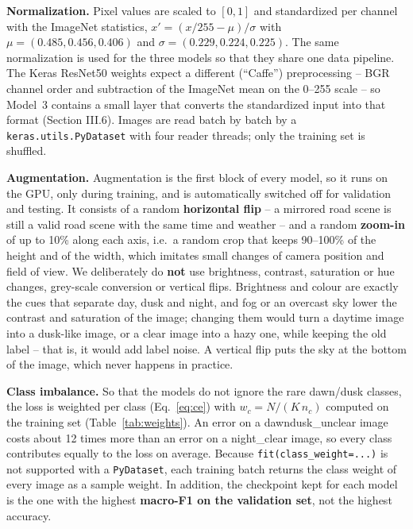 \documentclass[12pt,letterpaper]{article}
\begin{document}
\textbf{Normalization.} Pixel values are scaled to $[0,1]$ and standardized per channel with the ImageNet statistics,
$x'=(x/255-\mu)/\sigma$ with $\mu=(0.485,0.456,0.406)$ and $\sigma=(0.229,0.224,0.225)$. The same normalization is
used for the three models so that they share one data pipeline. The Keras ResNet50 weights expect a different
(``Caffe'') preprocessing -- BGR channel order and subtraction of the ImageNet mean on the 0--255 scale -- so Model~3
contains a small layer that converts the standardized input into that format (Section III.6). Images are read batch
by batch by a \texttt{keras.utils.PyDataset} with four reader threads; only the training set is shuffled.

\textbf{Augmentation.} Augmentation is the first block of every model, so it runs on the GPU, only during training,
and is automatically switched off for validation and testing. It consists of a random \textbf{horizontal flip} -- a
mirrored road scene is still a valid road scene with the same time and weather -- and a random \textbf{zoom-in} of up
to 10\% along each axis, i.e.\ a random crop that keeps 90--100\% of the height and of the width, which imitates small
changes of camera position and field of view. We deliberately do \textbf{not} use brightness, contrast, saturation or
hue changes, grey-scale conversion or vertical flips. Brightness and colour are exactly the cues that separate day,
dusk and night, and fog or an overcast sky lower the contrast and saturation of the image; changing them would turn a
daytime image into a dusk-like image, or a clear image into a hazy one, while keeping the old label -- that is, it
would add label noise. A vertical flip puts the sky at the bottom of the image, which never happens in practice.

\textbf{Class imbalance.} So that the models do not ignore the rare dawn/dusk classes, the loss is weighted per class
(Eq.~\ref{eq:ce}) with $w_c=N/(K\,n_c)$ computed on the training set (Table~\ref{tab:weights}). An error on a
dawndusk\_unclear image costs about 12 times more than an error on a night\_clear image, so every class contributes
equally to the loss on average. Because \texttt{fit(class\_weight=...)} is not supported with a \texttt{PyDataset},
each training batch returns the class weight of every image as a sample weight. In addition, the checkpoint kept for
each model is the one with the highest \textbf{macro-F1 on the validation set}, not the highest accuracy.
\end{document}
